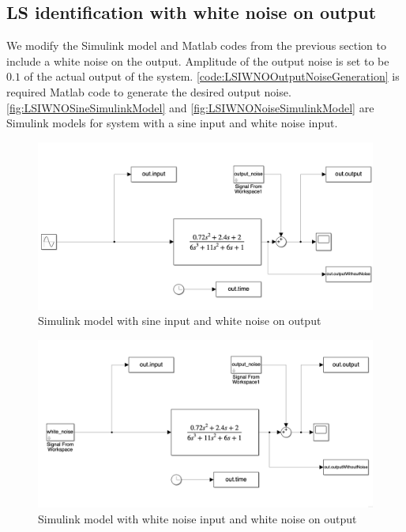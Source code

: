 \FloatBarrier
\subsection{LS identification with white noise on output}
We modify the Simulink model and Matlab codes from the previous section to include a white noise on the output. Amplitude of the output noise is set to be $0.1$ of the actual output of the system. \autoref{code:LSIWNOOutputNoiseGeneration} is required Matlab code to generate the desired output noise.
\autoref{fig:LSIWNOSineSimulinkModel} and \autoref{fig:LSIWNONoiseSimulinkModel} are Simulink models for system with a sine input and white noise input.

\begin{figure}
	\centering
	\includegraphics[totalheight=8cm]{images/LSIWNOSineSimulinkModel.png}
	\caption{Simulink model with sine input and white noise on output}
	\label{fig:LSIWNOSineSimulinkModel}
\end{figure}

\begin{figure}
	\centering
	\includegraphics[totalheight=8cm]{images/LSIWNONoiseSimulinkModel.png}
	\caption{Simulink model with white noise input and white noise on output}
	\label{fig:LSIWNONoiseSimulinkModel}
\end{figure}

